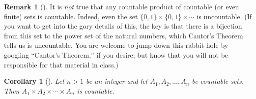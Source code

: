 \documentclass[10pt,openany,oneside]{book}
\theoremstyle{plain}
\newtheorem{corollary}[theorem]{Corollary}
\theoremstyle{definition}
\theoremstyle{definition}
\newtheorem{remark}[theorem]{Remark}
\theoremstyle{definition}
\theoremstyle{definition}
\numberwithin{equation}{section}
\begin{document}
\begin{remark}[]\label{remark-4}
It is \emph{not} true that any countable product of countable (or even finite) sets is countable. Indeed, even the set \(\{0,1\}\times \{0,1\}\times \cdots\) is uncountable. (If you want to get into the gory details of this, the key is that there is a bijection from this set to the power set of the natural numbers, which Cantor's Theorem tells us is uncountable.  You are welcome to jump down this rabbit hole by googling ``Cantor's Theorem,'' if you desire, but know that you will not be responsible for that material in class.)%
\end{remark}
\begin{corollary}[{}]\label{corollary-1}
Let \(n>1\) be an integer and let \(A_1,A_2,\ldots, A_n\) be countable sets. Then \(A_1\times A_2\times \cdots \times A_n\) is countable.%
\end{corollary}
\typeout{************************************************}
\typeout{************************************************}
\end{document}
